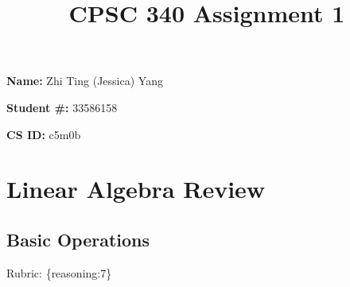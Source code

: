 \documentclass{article}
\def\rubric#1{\gre{Rubric: \{#1\}}}{}
\def\gre#1{{\color{gre}#1}}
\begin{document}
\title{CPSC 340 Assignment 1}

\date{}
\maketitle

\vspace{-4em}

\textbf{Name:} Zhi Ting (Jessica) Yang

\textbf{Student \#:} 33586158

\textbf{CS ID:} c5m0b
 
\section{Linear Algebra Review}

\subsection{Basic Operations}
\rubric{reasoning:7}
\end{document}
